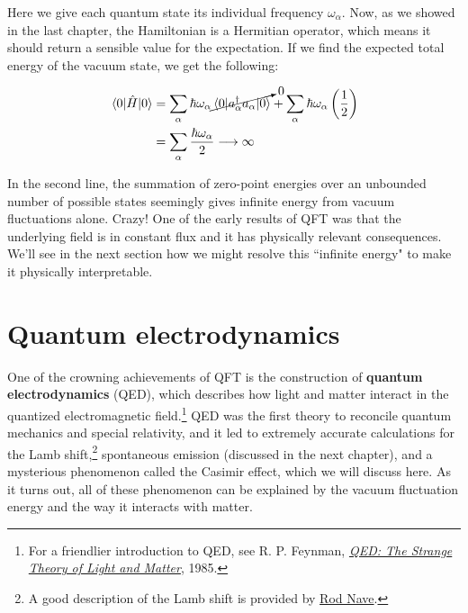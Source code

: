 Here we give each quantum state its individual frequency $\omega_{\alpha}$. 
Now, as we showed in the last chapter, the Hamiltonian is a Hermitian operator, which means it should return a sensible value for the expectation. 
If we find the expected total energy of the vacuum state, we get the following:

\begin{align*}
	\mel{0}{\hat{H}}{0} &= \sum_{\alpha} \hbar\omega_{\alpha} \cancelto{0}{\mel{0}{a^{\dagger}_{\alpha}a_{\alpha}}{0}} + \sum_{\alpha}\hbar\omega_{\alpha}\left(\frac{1}{2}\right) \\
	&= \sum_{\alpha} \frac{\hbar\omega_{\alpha}}{2} \longrightarrow \infty
\end{align*}

In the second line, the summation of zero-point energies over an unbounded number of possible states seemingly gives infinite energy from vacuum fluctuations alone. 
Crazy! 
One of the early results of QFT was that the underlying field is in constant flux and it has physically relevant consequences. 
We'll see in the next section how we might resolve this ``infinite energy" to make it physically interpretable.


\section{Quantum electrodynamics}

One of the crowning achievements of QFT is the construction of \textbf{quantum electrodynamics} (QED), which describes how light and matter interact in the quantized electromagnetic field.\footnote{For a friendlier introduction to QED, see R. P. Feynman, \href{https://en.wikipedia.org/wiki/QED:_The_Strange_Theory_of_Light_and_Matter}{\emph{QED: The Strange Theory of Light and Matter}}, 1985.} 
QED was the first theory to reconcile quantum mechanics and special relativity, and it led to extremely accurate calculations for the Lamb shift,\footnote{A good description of the Lamb shift is provided by \href{http://hyperphysics.phy-astr.gsu.edu/hbase/quantum/lamb.html}{Rod Nave}.} spontaneous emission (discussed in the next chapter), and a mysterious phenomenon called the Casimir effect, which we will discuss here. 
As it turns out, all of these phenomenon can be explained by the vacuum fluctuation energy and the way it interacts with matter.

